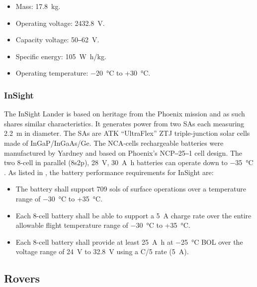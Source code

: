 \begin{itemize}
	\item Mass: \SI{17.8}{\kilo\gram}.
	\item Operating voltage: 24\SI{32.8}{\volt}.
	\item Capacity voltage: 50‒\SI{62}{\volt}.
	\item Specific energy: \SI{105}{\watt\hour/\kilo\gram}.
    \item Operating temperature: \SI{-20}{\celsius} to +\SI{30}{\celsius}.
\end{itemize}

\subsubsection{InSight}

The InSight Lander is based on heritage from the Phoenix mission and as such shares similar characteristics. It generates power from two \acp{SA} each measuring \SI{2.2}{\meter} in diameter. The \acp{SA} are  ATK ``UltraFlex'' ZTJ triple-junction solar cells made of \ac{InGaP}/\ac{InGaAs}/\ac{Ge}. The \ac{NCA}-cells rechargeable batteries were manufactured by Yardney and based on Phoenix's NCP‒25‒1 cell design. The two 8-cell in parallel (8s2p), \SI{28}{\volt}, \SI{30}{\ampere\hour} batteries can operate down to \SI{-35}{\celsius} . As listed in , the battery performance requirements for InSight are:

\begin{itemize}
  \item The battery shall support 709 sols of surface operations over a temperature range of \SI{-30}{\celsius} to +\SI{35}{\celsius}.
  \item Each 8-cell battery shall be able to support a \SI{5}{\ampere} charge rate over the entire allowable flight temperature range of \SI{-30}{\celsius} to +\SI{35}{\celsius}.
  \item Each 8-cell battery shall provide at least \SI{25}{\ampere\hour} at \SI{-25}{\celsius} \ac{BOL} over the voltage range of \SI{24}{\volt} to \SI{32.8}{\volt} using a C/5 rate (\SI{5}{\ampere}).
\end{itemize}

\clearpage
\subsection{Rovers}
\label{sec:StateOfTheArt:PastAndOngoingMissions:Rovers}

